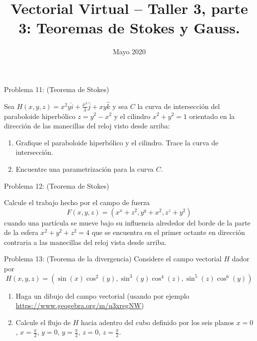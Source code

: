 \documentclass[usepdftitle=false]{beamer}
\title[]{Vectorial Virtual -- Taller 3, parte 3: Teoremas de Stokes y Gauss.}
\date{Mayo 2020}
\begin{document}
\maketitle
\begin{frame}{Problema 11: (Teorema de Stokes)}

Sea $H(x,y,z)=x^2y\hat{i} + \frac{x^3}{3}\hat{j} + xy\hat{k}$ y sea $C$ la curva de intersecci\'on del paraboloide hiperb\'olico $z=y^2-x^2$ y el cilindro $x^2+y^2=1$ orientado en la direcci\'on de las manecillas del reloj visto desde arriba:

\begin{enumerate}
\item Grafique el paraboloide hiperb\'olico y el cilindro. Trace la curva de intersecci\'on.
\item Encuentre una parametrizaci\'on para la curva $C$. 
\end{enumerate}

\end{frame}

\begin{frame}{Problema 12: (Teorema de Stokes)}

Calcule el trabajo hecho por el campo de fuerza
\[F(x,y,z) = \left(x^x+z^2, y^y+x^2, z^z+y^2\right)\]
cuando una part\'icula se mueve bajo su influencia alrededor del borde de la parte de la esfera $x^2+y^2+z^2=4$ que se encuentra en el primer octante en direcci\'on contraria a las manecillas del reloj vista desde arriba.

\end{frame}

\begin{frame}{Problema 13: (Teorema de la divergencia)}
Considere el campo vectorial $H$ dador por
\[H(x,y,z)=\left(\sin(x)\cos^2(y), \sin^3(y)\cos^4(z), \sin^5(z)\cos^6(y)\right)\]

\begin{enumerate}
\item Haga un dibujo del campo vectorial
(usando por ejemplo \url{https://www.geogebra.org/m/u3xregNW})

\item Calcule el flujo de $H$ hacia adentro del cubo definido por los seis planos $x=0$, $x=\frac{\pi}{2}$, $y=0$, $y=\frac{\pi}{2}$, $z=0$, $z=\frac{\pi}{2}$.
\end{enumerate}

\end{frame}
\end{document}
